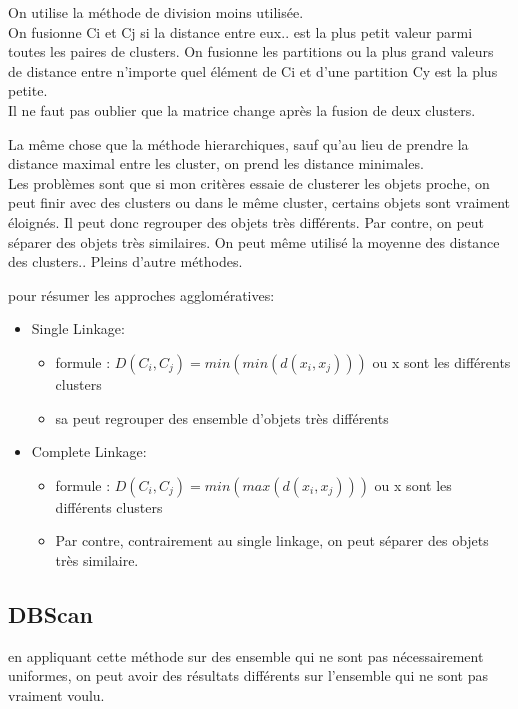 \documentclass[oneside]{book}
\begin{document}
On utilise la méthode de division moins utilisée.\\


On fusionne Ci et Cj si la distance entre eux.. est la plus petit valeur parmi toutes les paires de clusters. On fusionne les partitions ou la plus grand valeurs de distance entre n'importe quel élément de Ci et d'une partition Cy est la plus petite.\\


Il ne faut pas oublier que la matrice change après la fusion de deux clusters.


La même chose que la méthode hierarchiques, sauf qu'au lieu de prendre la distance maximal entre les cluster, on prend les distance minimales.\\


Les problèmes sont que si mon critères essaie de clusterer les objets proche, on peut finir avec des clusters ou dans le même cluster, certains objets sont vraiment éloignés. Il peut donc regrouper des objets très différents. Par contre, on peut séparer des objets très similaires. On peut même utilisé la moyenne des distance des clusters.. Pleins d'autre méthodes.


pour résumer les approches agglomératives: 
\begin{itemize}
\item Single Linkage:
\begin{itemize}
\item formule : $D(C_i, C_j) = min(min( d(x_i,x_j)))$ ou x sont les différents clusters
\item sa peut regrouper des ensemble d'objets très différents
\end{itemize}
\item Complete Linkage:
\begin{itemize}
\item formule :  $D(C_i, C_j) = min(max( d(x_i,x_j)))$ ou x sont les différents clusters

\item Par contre, contrairement au single linkage, on peut séparer des objets très similaire.
\end{itemize}
\end{itemize}

\subsection{DBScan}
en appliquant cette méthode sur des ensemble qui ne sont pas nécessairement uniformes, on peut avoir des résultats différents sur l'ensemble qui ne sont pas vraiment voulu.\\
\end{document}
